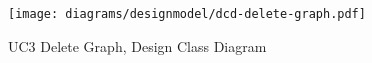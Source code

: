 \begin{figure}[p]%
\end{figure}
\begin{figure}[H]
    \centering
    \texttt{[image: diagrams/designmodel/dcd-delete-graph.pdf]}
    \caption{UC3 Delete Graph, Design Class Diagram}
    \label{fig:delete-graph-dcd}
\end{figure}
% 

